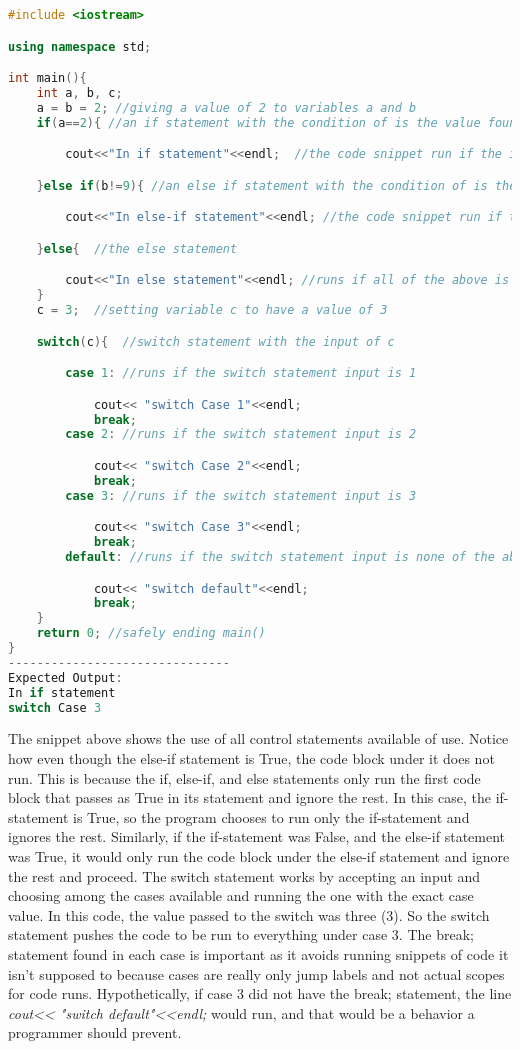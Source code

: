 \documentclass[12pt]{article}
\begin{document}
\begin{lstlisting}[language=C++]
#include <iostream>

using namespace std;

int main(){
    int a, b, c;
    a = b = 2; //giving a value of 2 to variables a and b
    if(a==2){ //an if statement with the condition of is the value found in a equal to 2

        cout<<"In if statement"<<endl;  //the code snippet run if the if statement is true

    }else if(b!=9){ //an else if statement with the condition of is the value found in b not equal to 9

        cout<<"In else-if statement"<<endl; //the code snippet run if the else if statement is true

    }else{  //the else statement

        cout<<"In else statement"<<endl; //runs if all of the above is deteremined to be false
    }
    c = 3;  //setting variable c to have a value of 3

    switch(c){  //switch statement with the input of c

        case 1: //runs if the switch statement input is 1

            cout<< "switch Case 1"<<endl;
            break;
        case 2: //runs if the switch statement input is 2

            cout<< "switch Case 2"<<endl;
            break;
        case 3: //runs if the switch statement input is 3

            cout<< "switch Case 3"<<endl;
            break;
        default: //runs if the switch statement input is none of the above

            cout<< "switch default"<<endl;
            break;
    }
    return 0; //safely ending main()
}
-------------------------------
Expected Output:
In if statement
switch Case 3
\end{lstlisting}
The snippet above shows the use of all control statements available of use. Notice how even though the else-if statement is True, the code block under it does not run. This is because the if, else-if, and else statements only run the first code block that passes as True in its statement and ignore the rest. In this case, the if-statement is True, so the program chooses to run only the if-statement and ignores the rest. Similarly, if the if-statement was False, and the else-if statement was True, it would only run the code block under the else-if statement and ignore the rest and proceed. The switch statement works by accepting an input and choosing among the cases available and running the one with the exact case value. In this code, the value passed to the switch was three (3). So the switch statement pushes the code to be run to everything under case 3. The break; statement found in each case is important as it avoids running snippets of code it isn't supposed to because cases are really only jump labels and not actual scopes for code runs. Hypothetically, if case 3 did not have the break; statement, the line \textit{cout<< "switch default"<<endl;} would run, and that would be a behavior a programmer should prevent.
\end{document}
